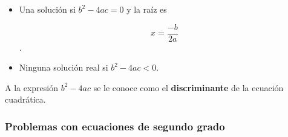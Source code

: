 \begin{enumerate}
\begin{boxH}
\begin{itemize}
                  \item Una solución si $b^2 - 4ac = 0$ y la raíz es

                        \[x = \frac{-b}{2a}\].

                  \item Ninguna solución real si $b^2 - 4ac < 0$.
              \end{itemize}

          \end{boxH}

          \begin{boxH}
              A la expresión \textbf{$b^2 - 4ac$} se le conoce como el \textbf{discriminante} de la ecuación
              cuadrática.
          \end{boxH}
\end{enumerate}

\newpage

\subsubsection{Problemas con ecuaciones de segundo grado}

